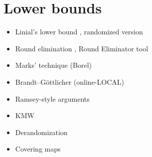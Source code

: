 \documentclass[a4paper,11pt]{article}
\begin{document}
\section{Lower bounds}
\begin{itemize}
    \item Linial's lower bound \cite{linial-1992-locality-in-distributed-graph-algorithms}, randomized version \cite{naor-1991-a-lower-bound-on-probabilistic-algorithms-for}
    \item Round elimination \cite{brandt-2019-an-automatic-speedup-theorem-for,brandt-fischer-etal-2016-a-lower-bound-for-the}, Round Eliminator tool \cite{olivetti-2020-brief-announcement-round-eliminator-a,olivetti-2025-round-eliminator-a-tool-for-automatic}
    \item Marks' technique (Borel) \cite{marks-2016-a-determinacy-approach-to-borel,brandt-chang-etal-2022-local-problems-on-trees-from-the}
    \item Brandt--G{\"o}ttlicher (online-LOCAL) \cite{brandt-gottlicher-2026-a-post-quantum-lower-bound-for}
    \item Ramsey-style arguments \cite{naor-stockmeyer-1995-what-can-be-computed-locally,czygrinow-hanckowiak-wawrzyniak-2008-fast-distributed}
    \item KMW \cite{kuhn-moscibroda-wattenhofer-2004-what-cannot-be,kuhn-moscibroda-wattenhofer-2006-the-price-of-being,kuhn-moscibroda-wattenhofer-2016-local-computation,coupette-lenzen-2021-a-breezing-proof-of-the-kmw-bound}
    \item Derandomization \cite{naor-stockmeyer-1995-what-can-be-computed-locally,chang-kopelowitz-pettie-2019-an-exponential-separation,dahal-d-amore-etal-2023-brief-announcement-distributed}
    \item Covering maps \cite{angluin-1980-local-and-global-properties-in-networks-of,yamashita-kameda-1996-computing-on-anonymous-networks}
\end{itemize}
\end{document}
